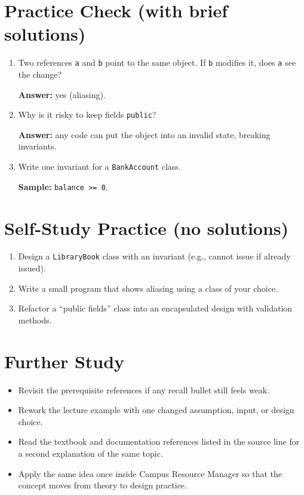 \documentclass[11pt]{article}
\begin{document}
\section{Practice Check (with brief solutions)}
\begin{enumerate}
  \item Two references \texttt{a} and \texttt{b} point to the same object. If \texttt{b} modifies it, does \texttt{a} see the change?\par
  \textbf{Answer:} yes (aliasing).

  \item Why is it risky to keep fields \texttt{public}?\par
  \textbf{Answer:} any code can put the object into an invalid state, breaking invariants.

  \item Write one invariant for a \texttt{BankAccount} class.\par
  \textbf{Sample:} \texttt{balance >= 0}.
\end{enumerate}

\section{Self-Study Practice (no solutions)}
\begin{enumerate}
  \item Design a \texttt{LibraryBook} class with an invariant (e.g., cannot issue if already issued).
  \item Write a small program that shows aliasing using a class of your choice.
  \item Refactor a ``public fields'' class into an encapsulated design with validation methods.
\end{enumerate}

\section{Further Study}
\begin{itemize}
  \item Revisit the prerequisite references if any recall bullet still feels weak.
  \item Rework the lecture example with one changed assumption, input, or design choice.
  \item Read the textbook and documentation references listed in the source line for a second explanation of the same topic.
  \item Apply the same idea once inside Campus Resource Manager so that the concept moves from theory to design practice.
\end{itemize}
\notesources{\OOPSUnitIISources}
\end{document}

